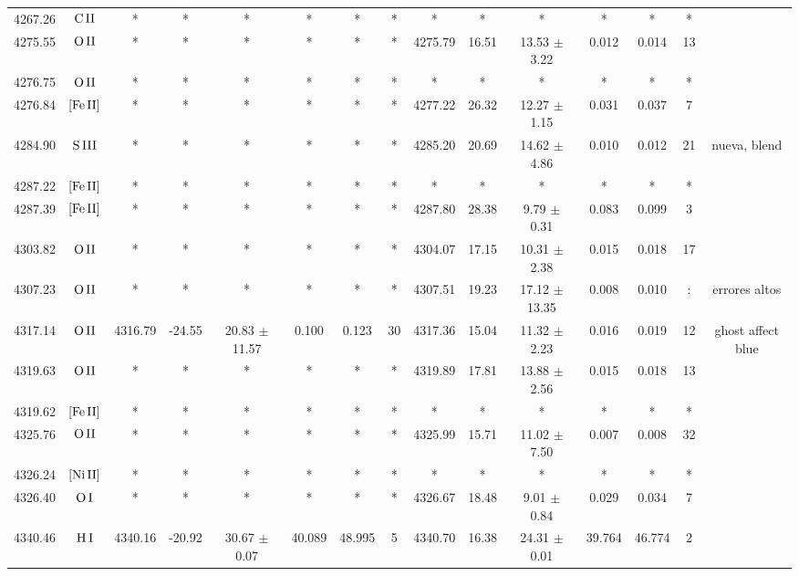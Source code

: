 \documentclass{article}
\begin{document}
\begin{table*}
\begin{adjustbox}{width=\textwidth}
\begin{tabular}{ccccccccccccccc}
4267.26 & $\mbox{C}\thinspace \mbox{II}$ & * & * & * & * & * & * & * & * & * & * & * & * &  \\
4275.55 & $\mbox{O}\thinspace \mbox{II}$ & * & * & * & * & * & * & 4275.79 & 16.51 & 13.53 $\pm$ 3.22 & 0.012 & 0.014 & 13 &  \\
4276.75 & $\mbox{O}\thinspace \mbox{II}$ & * & * & * & * & * & * & * & * & * & * & * & * &  \\
4276.84 & $\mbox{[Fe}\thinspace \mbox{II]}$ & * & * & * & * & * & * & 4277.22 & 26.32 & 12.27 $\pm$ 1.15 & 0.031 & 0.037 & 7 &  \\
4284.90 & $\mbox{S}\thinspace \mbox{III}$ & * & * & * & * & * & * & 4285.20 & 20.69 & 14.62 $\pm$ 4.86 & 0.010 & 0.012 & 21 &  nueva, blend \\
4287.22 & $\mbox{[Fe}\thinspace \mbox{II]}$ & * & * & * & * & * & * & * & * & * & * & * & * &  \\
4287.39 & $\mbox{[Fe}\thinspace \mbox{II]}$ & * & * & * & * & * & * & 4287.80 & 28.38 & 9.79 $\pm$ 0.31 & 0.083 & 0.099 & 3 &  \\
4303.82 & $\mbox{O}\thinspace \mbox{II}$ & * & * & * & * & * & * & 4304.07 & 17.15 & 10.31 $\pm$ 2.38 & 0.015 & 0.018 & 17 &  \\
4307.23 & $\mbox{O}\thinspace \mbox{II}$ & * & * & * & * & * & * & 4307.51 & 19.23 & 17.12 $\pm$ 13.35 & 0.008 & 0.010 & : &  errores altos \\
4317.14 & $\mbox{O}\thinspace \mbox{II}$ & 4316.79 & -24.55 & 20.83 $\pm$ 11.57 & 0.100 & 0.123 & 30 & 4317.36 & 15.04 & 11.32 $\pm$ 2.23 & 0.016 & 0.019 & 12 &  ghost affect blue \\
4319.63 & $\mbox{O}\thinspace \mbox{II}$ & * & * & * & * & * & * & 4319.89 & 17.81 & 13.88 $\pm$ 2.56 & 0.015 & 0.018 & 13 &  \\
4319.62 & $\mbox{[Fe}\thinspace \mbox{II]}$ & * & * & * & * & * & * & * & * & * & * & * & * &  \\
4325.76 & $\mbox{O}\thinspace \mbox{II}$ & * & * & * & * & * & * & 4325.99 & 15.71 & 11.02 $\pm$ 7.50 & 0.007 & 0.008 & 32 &  \\
4326.24 & $\mbox{[Ni}\thinspace \mbox{II]}$ & * & * & * & * & * & * & * & * & * & * & * & * &  \\
4326.40 & $\mbox{O}\thinspace \mbox{I}$ & * & * & * & * & * & * & 4326.67 & 18.48 & 9.01 $\pm$ 0.84 & 0.029 & 0.034 & 7 &  \\
4340.46 & $\mbox{H}\thinspace \mbox{I}$ & 4340.16 & -20.92 & 30.67 $\pm$ 0.07 & 40.089 & 48.995 & 5 & 4340.70 & 16.38 & 24.31 $\pm$ 0.01 & 39.764 & 46.774 & 2 &  \\

\end{tabular}
\end{adjustbox}
\end{table*}
\end{document}
